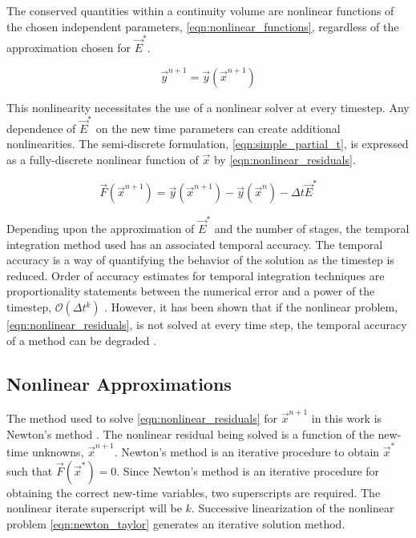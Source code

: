 The conserved quantities within a continuity volume are nonlinear functions of the chosen independent parameters, \eqref{eqn:nonlinear_functions}, regardless of the approximation chosen for $\vec{E}^{*}$.

\begin{equation}
\label{eqn:nonlinear_functions}
\vec{y}^{n+1} = \vec{y}(\vec{x}^{n+1})
\end{equation}

This nonlinearity necessitates the use of a nonlinear solver at every timestep.
Any dependence of $\vec{E}^{*}$ on the new time parameters can create additional nonlinearities.
The semi-discrete formulation, \eqref{eqn:simple_partial_t}, is expressed as a fully-discrete nonlinear function of $\vec{x}$ by \eqref{eqn:nonlinear_residuals}.

\begin{equation}
\label{eqn:nonlinear_residuals}
\vec{F}(\vec{x}^{n+1}) = \vec{y}(\vec{x}^{n+1}) - \vec{y}(\vec{x}^n) -\Delta t \vec{E}^{*}
\end{equation}

Depending upon the approximation of $\vec{E}^{*}$ and the number of stages, the temporal integration method used has an associated temporal accuracy.
The temporal accuracy is a way of quantifying the behavior of the solution as the timestep is reduced.
Order of accuracy estimates for temporal integration techniques are proportionality statements between the numerical error and a power of the timestep, $\mathcal{O}(\Delta t^k)$ \cite{LeVeque2007}. 
However, it has been shown that if the nonlinear problem, \eqref{eqn:nonlinear_residuals}, is not solved at every time step, the temporal accuracy of a method can be degraded \cite{Knoll2001, Mahaffy1993}.

\subsection{Nonlinear Approximations}
\label{subsect:nonlinear_approximations}

The method used to solve \eqref{eqn:nonlinear_residuals} for $\vec{x}^{n+1}$ in this work is Newton's method \cite{Deuflhard2004, Dennis1996}.
The nonlinear residual being solved is a function of the new-time unknowns, $\vec{x}^{n+1}$.
Newton's method is an iterative procedure to obtain $\vec{x}^{*}$ such that $\vec{F}(\vec{x}^{*}) = 0$.
Since Newton's method is an iterative procedure for obtaining the correct new-time variables, two superscripts are required.
The nonlinear iterate superscript will be $k$.
Successive linearization of the nonlinear problem \eqref{eqn:newton_taylor} generates an iterative solution method.

